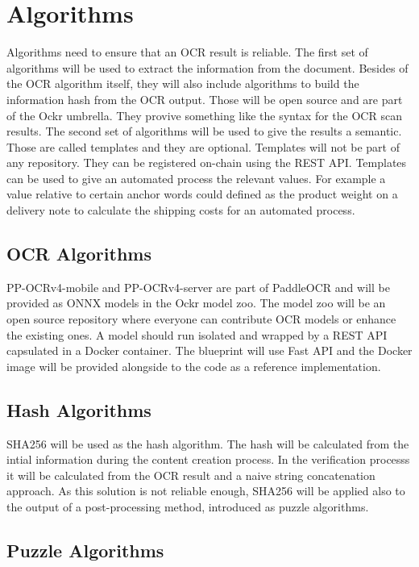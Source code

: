 \documentclass[../ockr-specification.tex]{subfiles}
\begin{document}
\section{Algorithms}

Algorithms need to ensure that an OCR result is reliable. The first set of algorithms will be used to extract the information from the document. Besides of the OCR algorithm itself, they will also include algorithms to build the information hash from the OCR output. Those will be open source and are part of the Ockr umbrella. They provive something like the syntax for the OCR scan results. The second set of algorithms will be used to give the results a semantic. Those are called templates and they are optional. Templates will not be part of any repository. They can be registered on-chain using the REST API. Templates can be used to give an automated process the relevant values. For example a value relative to certain anchor words could defined as the product weight on a delivery note to calculate the shipping costs for an automated process.

\subsection{OCR Algorithms}

PP-OCRv4-mobile and PP-OCRv4-server are part of PaddleOCR and will be provided as ONNX models in the Ockr model zoo. The model zoo will be an open source repository where everyone can contribute OCR models or enhance the existing ones. A model should run isolated and wrapped by a REST API capsulated in a Docker container. The blueprint will use Fast API and the Docker image will be provided alongside to the code as a reference implementation.

\subsection{Hash Algorithms}

SHA256 will be used as the hash algorithm. The hash will be calculated from the intial information during the content creation process. In the verification processs it will be calculated from the OCR result and a naive string concatenation approach. As this solution is not reliable enough, SHA256 will be applied also to the output of a post-processing method, introduced as puzzle algorithms.

\subsection{Puzzle Algorithms}
\end{document}
